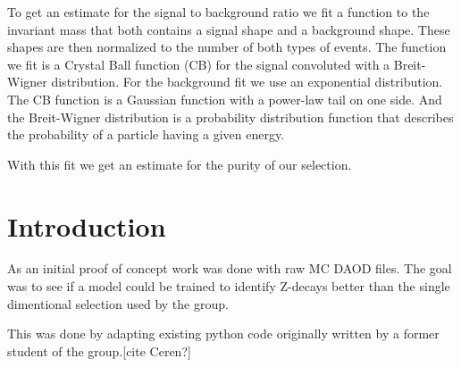 \documentclass{tufte-book}
\begin{document}
To get an estimate for the signal to background ratio we fit a function to the invariant mass that both contains a signal shape and a background shape. These shapes are then normalized to the number of both types of events.
The function we fit is a Crystal Ball function (CB) for the signal convoluted with a Breit-Wigner distribution.
For the background fit we use an exponential distribution.
The CB function is a Gaussian function with a power-law tail on one side. %
And the Breit-Wigner distribution is a probability distribution function that describes the probability of a particle having a given energy.%

With this fit we get an estimate for the purity of our selection.
















\chapter{Introduction}


As an initial proof of concept work was done with raw MC DAOD files.
The goal was to see if a model could be trained to identify Z-decays better than the single dimentional selection used by the group.

This was done by adapting existing python code originally written by a former student of the group.[cite Ceren?]
\end{document}
